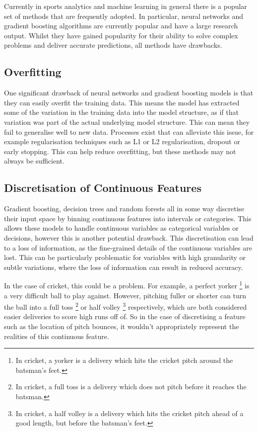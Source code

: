 \documentclass[12pt,a4paper]{report}
\theoremstyle{definition}
\begin{document}
Currently in sports analytics and machine learning in general there is a popular set of methods that are frequently adopted.
In particular, neural networks and gradient boosting algorithms are currently popular and have a large research output.
Whilst they have gained popularity for their ability to solve complex problems and deliver accurate predictions, all methods have drawbacks.

\subsection{Overfitting}

One significant drawback of neural networks and gradient boosting models is that they can easily overfit the training data.
This means the model has extracted some of the variation in the training data into the model structure, as if that variation was part of the actual underlying model structure.
This can mean they fail to generalise well to new data. 
Processes exist that can alleviate this issue, for example regularisation \citep{Girosi1995} techniques such as L1 or L2 regularisation, dropout or early stopping.
This can help reduce overfitting, but these methods may not always be sufficient.

\subsection{Discretisation of Continuous Features} \label{sec:DiscretisingFeatures}

Gradient boosting, decision trees and random forests all in some way discretise their input space by binning continuous features into intervals or categories. 
This allows these models to handle continuous variables as categorical variables or decisions, however this is another potential drawback.
This discretisation can lead to a loss of information, as the fine-grained details of the continuous variables are lost. 
This can be particularly problematic for variables with high granularity or subtle variations, where the loss of information can result in reduced accuracy.

In the case of cricket, this could be a problem.
For example, a perfect yorker \footnote{In cricket, a yorker is a delivery which hits the cricket pitch around the batsman's feet.} is a very difficult ball to play against. 
However, pitching fuller or shorter can turn the ball into a full toss \footnote{In cricket, a full toss is a delivery which does not pitch before it reaches the batsman.} or half volley \footnote{In cricket, a half volley is a delivery which hits the cricket pitch ahead of a good length, but before the batsman's feet.} respectively, which are both considered easier deliveries to score high runs off of.
So in the case of discretising a feature such as the location of pitch bounces, it wouldn't appropriately represent the realities of this continuous feature.
\end{document}
